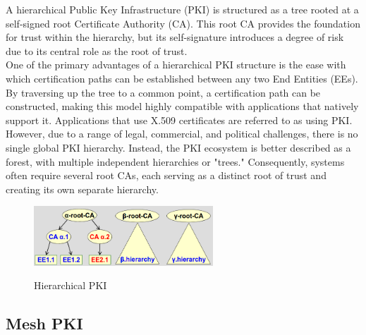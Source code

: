 A hierarchical Public Key Infrastructure (PKI) is structured as a tree
rooted at a self-signed root Certificate Authority (CA). This root CA
provides the foundation for trust within the hierarchy, but its
self-signature introduces a degree of risk due to its central role as
the root of trust.\\
One of the primary advantages of a hierarchical PKI structure is the
ease with which certification paths can be established between any two
End Entities (EEs). By traversing up the tree to a common point, a
certification path can be constructed, making this model highly
compatible with applications that natively support it. Applications
that use X.509 certificates are referred to as using PKI.\\
However, due to a range of legal, commercial, and political
challenges, there is no single global PKI hierarchy. Instead, the PKI
ecosystem is better described as a forest, with multiple independent
hierarchies or "trees." Consequently, systems often require several
root CAs, each serving as a distinct root of trust and creating its
own separate hierarchy.
\begin{figure}[H]
  \centering
  \includegraphics[width=0.6\textwidth]{img/x509 hierarchical pki.png}
  \label{fig:hierarchical PKI}

  \caption{Hierarchical PKI}
\end{figure}

\subsection{Mesh PKI}

